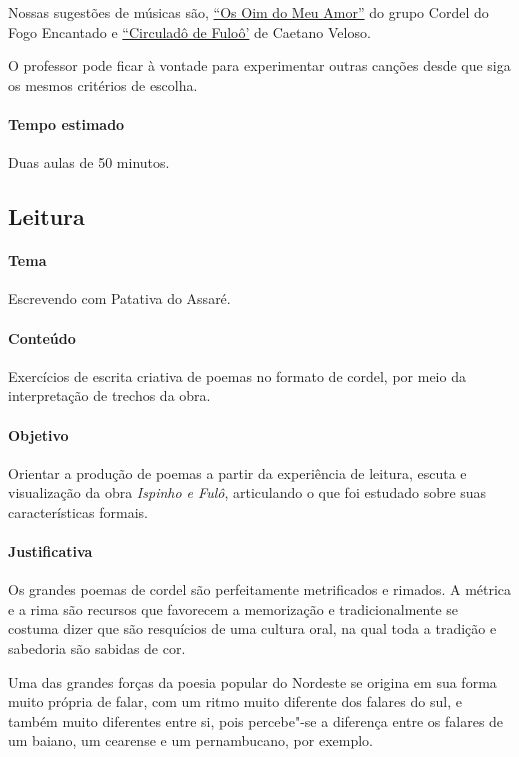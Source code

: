 \documentclass[12pt]{extarticle}
\begin{document}
{\begin{enumerate}
Nossas sugestões de músicas são, \href{https://www.youtube.com/watch?v=S1eE0lGpi-c&ab_channel=CordeldoFogoEncantado}{``Os Oim do Meu Amor''} 
do grupo Cordel do Fogo Encantado e \href{https://www.youtube.com/watch?v=pPmQYbTE21M&ab_channel=CaetanoVeloso-Topic}{``Circuladô de Fuloô'} de Caetano Veloso.

O professor pode ficar à vontade para experimentar outras canções desde 
que siga os mesmos critérios de escolha. 


\end{enumerate}

\paragraph{Tempo estimado} Duas aulas de 50 minutos. 

\subsection{Leitura}

\paragraph{Tema} Escrevendo com Patativa do Assaré.

\paragraph{Conteúdo} Exercícios de escrita criativa de poemas no formato 
de cordel, por meio da interpretação de trechos da obra.

\paragraph{Objetivo} Orientar a produção de poemas a partir da experiência
de leitura, escuta e visualização da obra \emph{Ispinho e Fulô}, 
articulando o que foi estudado sobre suas características formais.

\paragraph{Justificativa} Os grandes poemas de cordel são perfeitamente 
metrificados e rimados. A métrica e a rima são recursos que
favorecem a memorização e tradicionalmente se costuma
dizer que são resquícios de uma cultura oral, na qual toda a
tradição e sabedoria são sabidas de cor.

Uma das grandes forças da poesia popular do Nordeste
se origina em sua forma muito própria de falar, com um
ritmo muito diferente dos falares do sul, e também muito
diferentes entre si, pois percebe"-se a diferença entre os
falares de um baiano, um cearense e um pernambucano,
por exemplo.

}
\end{document}
